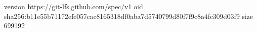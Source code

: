 version https://git-lfs.github.com/spec/v1
oid sha256:b11e55b71172efe057cac8165318df0aba7d5740799d80f7f9c8a4fc309d03f9
size 699192
